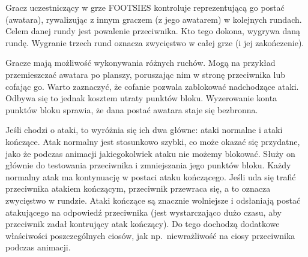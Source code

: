 Gracz uczestniczący w grze FOOTSIES kontroluje reprezentującą go postać (awatara), rywalizując z innym graczem (z jego awatarem) w kolejnych rundach. Celem danej rundy jest powalenie przeciwnika. Kto tego dokona, wygrywa daną rundę. Wygranie trzech rund oznacza zwycięstwo w całej grze (i jej zakończenie).

Gracze mają możliwość wykonywania różnych ruchów. Mogą na przykład przemieszczać awatara po planszy, poruszając nim w stronę przeciwnika lub cofając go. Warto zaznaczyć, że cofanie pozwala zablokować nadchodzące ataki. Odbywa się to jednak kosztem utraty punktów bloku. Wyzerowanie konta punktów bloku sprawia, że dana postać awatara staje się bezbronna.

Jeśli chodzi o ataki, to wyróżnia się ich dwa główne: ataki normalne i ataki kończące. Atak normalny jest stosunkowo szybki, co może okazać się przydatne, jako że podczas animacji jakiegokolwiek ataku nie możemy blokować. Służy on głównie do testowania przeciwnika i zmniejszania jego punktów bloku. Każdy normalny atak ma kontynuację w postaci ataku kończącego. Jeśli uda się trafić przeciwnika atakiem kończącym, przeciwnik przewraca się, a to oznacza zwycięstwo w rundzie. Ataki kończące są znacznie wolniejsze i odsłaniają postać atakującego na odpowiedź przeciwnika (jest wystarczająco dużo czasu, aby przeciwnik zadał kontrujący atak kończący). Do tego dochodzą dodatkowe właściwości poszczególnych ciosów, jak np.\ niewrażliwość na ciosy przeciwnika podczas animacji.

